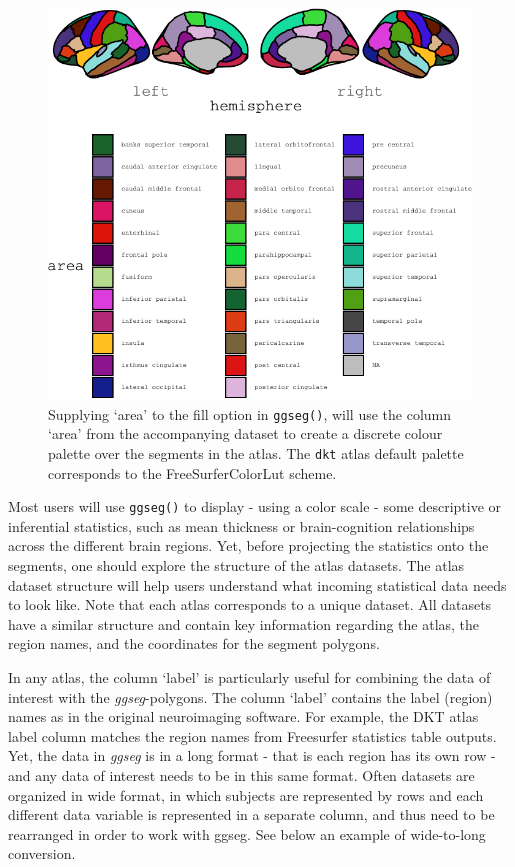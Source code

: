 \documentclass[fleqn,10pt]{wlpeerj} %
\begin{document}
\begin{figure}
\centering
\includegraphics{draft_2_files/figure-latex/fill-1.pdf}
\caption{\label{fig:fill}Supplying `area' to the fill option in \texttt{ggseg()}, will use the column `area' from the accompanying dataset to create a discrete colour palette over the segments in the atlas. The \texttt{dkt} atlas default palette corresponds to the FreeSurferColorLut scheme.}
\end{figure}

Most users will use \texttt{ggseg()} to display - using a color scale - some descriptive or inferential statistics, such as mean thickness or brain-cognition relationships across the different brain regions.
Yet, before projecting the statistics onto the segments, one should explore the structure of the atlas datasets.
The atlas dataset structure will help users understand what incoming statistical data needs to look like.
Note that each atlas corresponds to a unique dataset.
All datasets have a similar structure and contain key information regarding the atlas, the region names, and the coordinates for the segment polygons.

In any atlas, the column `label' is particularly useful for combining the data of interest with the \emph{ggseg}-polygons.
The column `label' contains the label (region) names as in the original neuroimaging software.
For example, the DKT atlas label column matches the region names from Freesurfer statistics table outputs.
Yet, the data in \emph{ggseg} is in a long format - that is each region has its own row - and any data of interest needs to be in this same format.
Often datasets are organized in wide format, in which subjects are represented by rows and each different data variable is represented in a separate column, and thus need to be rearranged in order to work with ggseg.
See below an example of wide-to-long conversion.
\end{document}
